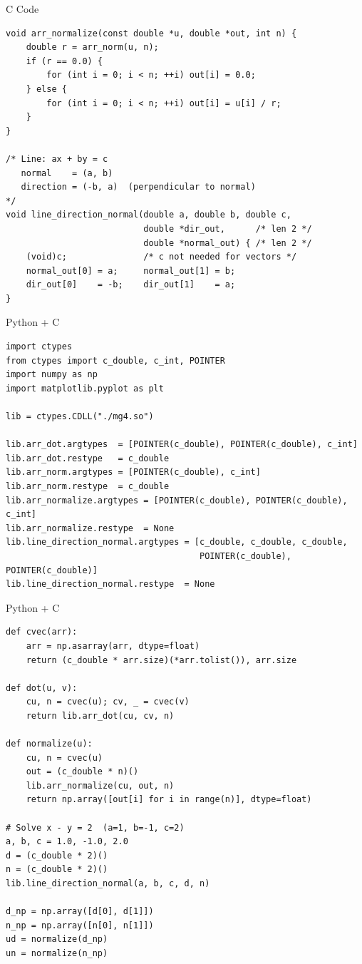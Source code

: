 \documentclass{beamer}
\begin{document}
\begin{frame}[fragile]{C Code}
\begin{lstlisting}
void arr_normalize(const double *u, double *out, int n) {
    double r = arr_norm(u, n);
    if (r == 0.0) {
        for (int i = 0; i < n; ++i) out[i] = 0.0;
    } else {
        for (int i = 0; i < n; ++i) out[i] = u[i] / r;
    }
}

/* Line: ax + by = c
   normal    = (a, b)
   direction = (-b, a)  (perpendicular to normal)
*/
void line_direction_normal(double a, double b, double c,
                           double *dir_out,      /* len 2 */
                           double *normal_out) { /* len 2 */
    (void)c;               /* c not needed for vectors */
    normal_out[0] = a;     normal_out[1] = b;
    dir_out[0]    = -b;    dir_out[1]    = a;
}
\end{lstlisting}
\end{frame}

\begin{frame}[fragile]{Python + C}
\begin{lstlisting}
import ctypes
from ctypes import c_double, c_int, POINTER
import numpy as np
import matplotlib.pyplot as plt

lib = ctypes.CDLL("./mg4.so")

lib.arr_dot.argtypes  = [POINTER(c_double), POINTER(c_double), c_int]
lib.arr_dot.restype   = c_double
lib.arr_norm.argtypes = [POINTER(c_double), c_int]
lib.arr_norm.restype  = c_double
lib.arr_normalize.argtypes = [POINTER(c_double), POINTER(c_double), c_int]
lib.arr_normalize.restype  = None
lib.line_direction_normal.argtypes = [c_double, c_double, c_double,
                                      POINTER(c_double), POINTER(c_double)]
lib.line_direction_normal.restype  = None
\end{lstlisting}
\end{frame}

\begin{frame}[fragile]{Python + C }
\begin{lstlisting}
def cvec(arr):
    arr = np.asarray(arr, dtype=float)
    return (c_double * arr.size)(*arr.tolist()), arr.size

def dot(u, v):
    cu, n = cvec(u); cv, _ = cvec(v)
    return lib.arr_dot(cu, cv, n)

def normalize(u):
    cu, n = cvec(u)
    out = (c_double * n)()
    lib.arr_normalize(cu, out, n)
    return np.array([out[i] for i in range(n)], dtype=float)

# Solve x - y = 2  (a=1, b=-1, c=2)
a, b, c = 1.0, -1.0, 2.0
d = (c_double * 2)()
n = (c_double * 2)()
lib.line_direction_normal(a, b, c, d, n)

d_np = np.array([d[0], d[1]])
n_np = np.array([n[0], n[1]])
ud = normalize(d_np)
un = normalize(n_np)
\end{lstlisting}
\end{frame}
\end{document}
